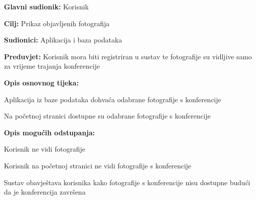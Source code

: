 				
					\noindent {}
				\begin{packed_item}
					
					\item \textbf{Glavni sudionik: }Korisnik
					\item  \textbf{Cilj:} Prikaz objavljenih fotografija
					\item  \textbf{Sudionici:} Aplikacija i baza podataka
					\item  \textbf{Preduvjet:} Korisnik mora biti registriran u sustav te fotografije su vidljive samo za vrijeme trajanja konferencije
					\item  \textbf{Opis osnovnog tijeka:}
					
					\item[] \begin{packed_enum}
						
						\item Aplikacija iz baze podataka dohvaća odabrane fotografije s konferencije
						\item Na početnoj stranici dostupne su odabrane fotografije s konferencije 
						
					\end{packed_enum}
					
					\item  \textbf{Opis mogućih odstupanja:}
					
					\item[] \begin{packed_item}
						
						\item[2.a] Korisnik ne vidi fotografije
						\item[] \begin{packed_enum}
							
							\item Korisnik na početnoj stranici ne vidi fotografije s konferencije
							\item Sustav obavještava korisnika kako fotografije s konferencije nisu dostupne budući da je konferencija završena 
							
						\end{packed_enum}
						
					\end{packed_item}
				\end{packed_item}
				
